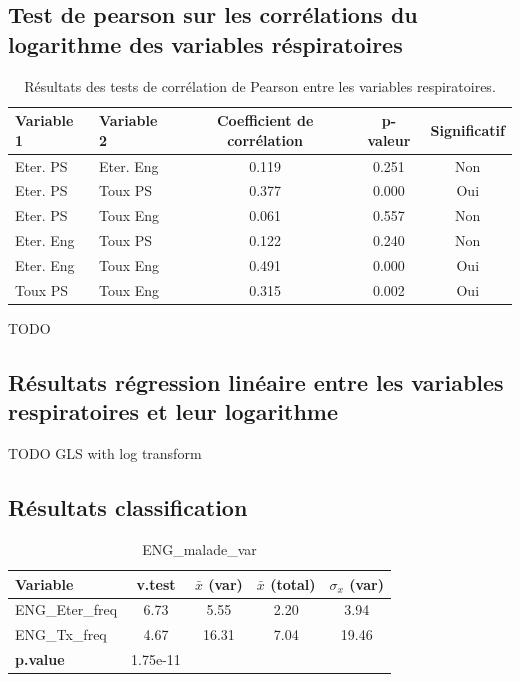 \documentclass{article}
\begin{document}
\subsection{Test de pearson sur les corrélations du logarithme des variables réspiratoires}\label{annexe:pearson_log}
\begin{table}[ht]
    \centering
    \begin{tabular}{llccc}
    \toprule
    \textbf{Variable 1} & \textbf{Variable 2} & \textbf{Coefficient de corrélation} & \textbf{p-valeur} & \textbf{Significatif} \\
    \midrule
    Eter. PS & Eter. Eng & 0.119 & 0.251 & Non \\
    Eter. PS & Toux PS & 0.377 & 0.000 & Oui \\
    Eter. PS & Toux Eng & 0.061 & 0.557 & Non \\
    Eter. Eng & Toux PS & 0.122 & 0.240 & Non \\
    Eter. Eng & Toux Eng & 0.491 & 0.000 & Oui \\
    Toux PS & Toux Eng & 0.315 & 0.002 & Oui \\
    \bottomrule
    \end{tabular}
    \caption{Résultats des tests de corrélation de Pearson entre les variables respiratoires.}\label{tab:correlation_log_results}
\end{table}
TODO


\subsection{Résultats régression linéaire entre les variables respiratoires et leur logarithme}\label{annexe:reg_lin_log}
TODO GLS with log transform 

\subsection{Résultats classification}

\begin{table}[ht]
    \centering
    \begin{tabular}{lcccc}
        \toprule
        \textbf{Variable} & \textbf{v.test} & \textbf{$\bar{x}$ (var)} & \textbf{$\bar{x}$ (total)} & \textbf{$\sigma_x$ (var)} \\
        \midrule
        ENG\_Eter\_freq & 6.73 & 5.55 & 2.20 & 3.94 \\
        ENG\_Tx\_freq  & 4.67 & 16.31 & 7.04 & 19.46 \\
        \midrule
        \textbf{p.value} & 1.75e-11 & & & \\
        \bottomrule
    \end{tabular}
    \caption{ENG\_malade\_var}
\end{table}
    
\end{document}
